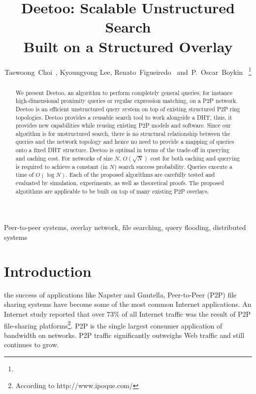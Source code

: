 \documentclass[9.5pt,journal,final,finalsubmission,twocolumn]{IEEEtran}
\begin{document}
\title{Deetoo: Scalable Unstructured Search \\
	Built on a Structured Overlay}
\author{ Taewoong~Choi~,
         Kyoungyong Lee,
         Renato~Figueiredo~
         and~P.~Oscar~Boykin~%
\thanks{}%
}
\maketitle
\begin{abstract}
We present Deetoo, an algorithm to perform completely general queries,
for instance high-dimensional proximity queries or regular expression
matching, on a P2P network.  
Deetoo is an efficient unstructured query system on top of existing 
structured P2P ring topologies.
Deetoo provides a reusable search tool to work alongside a DHT, thus,
it provides new capabilities while reusing existing P2P models and software.
Since our algorithm is for unstructured search, there is
no structural relationship between the queries and the network topology
and hence no need to provide a mapping of queries onto a fixed DHT structure.
Deetoo is optimal in terms of the trade-off in querying and caching cost.
For networks of size $N$,
$O(\sqrt{N})$ cost for both caching and querying is required to achieve
a constant (in $N$) search success probability.  Queries execute a time
of $O(\log N)$.
Each of the proposed algorithms are carefully tested and evaluated by 
simulation, experiments, as well as theoretical proofs. The proposed 
algotithms are applicable to be built on top of many existing P2P 
overlays.

\end{abstract}

\begin{IEEEkeywords}
Peer-to-peer systems, overlay network, file searching,
query flooding, distributed systems
\end{IEEEkeywords}
\section{Introduction}\label{sec:introduction} 
 the success of applications like 
Napster and Gnutella,
Peer-to-Peer (P2P) file sharing systems have become some of the most
common Internet applications. An Internet study reported
that over 73\% of all Internet traffic was 
the result of P2P file-sharing platforms\footnote{According 
to http://www.ipoque.com/}.
P2P is the single largest consumer application of bandwidth on 
networks. P2P traffic significantly outweighs Web traffic 
and still continues to grow\cite{Goth06b}.
\end{document}

